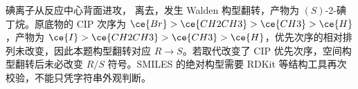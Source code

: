 碘离子从反应中心背面进攻， 离去，发生 Walden 构型翻转，产物为 $(S)$-2-碘丁烷。原底物的 CIP 次序为 $\ce{Br}>\ce{CH2CH3}>\ce{CH3}>\ce{H}$，产物为 $\ce{I}>\ce{CH2CH3}>\ce{CH3}>\ce{H}$，优先次序的相对排列未改变，因此本题构型翻转对应 $R\to S$。若取代改变了 CIP 优先次序，空间构型翻转后未必改变 $R/S$ 符号。SMILES 的绝对构型需要 RDKit 等结构工具再次校验，不能只凭字符串外观判断。
